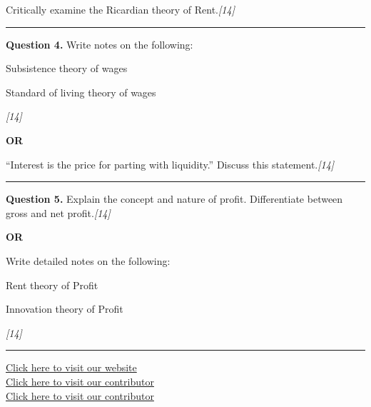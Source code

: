 \documentclass[11pt,a4paper]{article}
\newcommand{\pts}[1]{\hfill   \textit{[#1]}}
\begin{document}
Critically examine the Ricardian theory of Rent.\pts{14}

\medskip\rule{\linewidth}{0.2pt}




\noindent   \textbf{Question 4.}
Write notes on the following:

\begin{parts}
  \item Subsistence theory of wages
  \item Standard of living theory of wages
\end{parts}\pts{14}

\centerline{   \textbf{OR}}

``Interest is the price for parting with liquidity.'' Discuss this statement.\pts{14}

\medskip\rule{\linewidth}{0.2pt}




\noindent   \textbf{Question 5.}
Explain the concept and nature of profit. Differentiate between gross and net profit.\pts{14}

\centerline{   \textbf{OR}}

Write detailed notes on the following:

\begin{parts}
  \item Rent theory of Profit
  \item Innovation theory of Profit
\end{parts}\pts{14}

\vfill
\rule{\linewidth}{0.4pt}

\begin{center}\small
\href{https://bhu-exam.vercel.app/}{Click here to visit our website}\\[4pt]
\href{https://me-aryan.vercel.app/}{Click here to visit our contributor}\\[4pt]
\href{https://quashan-me.vercel.app/}{Click here to visit our contributor}
\end{center}
\end{document}
